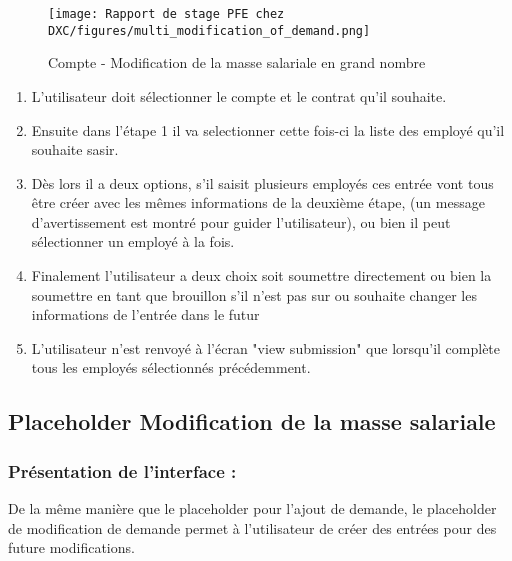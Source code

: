 \begin{figure}[H]
    \centering
    \texttt{[image: Rapport de stage PFE chez DXC/figures/multi\_modification\_of\_demand.png]}
    \caption{Compte - Modification de la masse salariale en grand nombre}
\end{figure}

\begin{enumerate}
    
    \item L'utilisateur doit sélectionner le compte et le contrat qu'il souhaite.
    \vspace{0.1cm}
    \item Ensuite dans l'étape 1 il va selectionner cette fois-ci la liste des employé qu'il souhaite sasir.
    \vspace{0.1cm}
    \item Dès lors il a deux options, s’il saisit plusieurs employés ces entrée vont tous être créer avec les mêmes informations de la deuxième étape, (un message d'avertissement est montré pour guider l'utilisateur), ou bien il peut sélectionner un employé à la fois.
    \vspace{0.1cm}
    \item Finalement l'utilisateur a deux choix soit soumettre directement ou bien la soumettre en tant que brouillon s'il n'est pas sur ou souhaite changer les informations de l'entrée dans le futur
    \item L'utilisateur n'est renvoyé à l'écran "view submission" que lorsqu'il complète tous les employés sélectionnés précédemment.

\end{enumerate}


\newpage


\subsection{Placeholder Modification de la masse salariale}

\subsubsection{Présentation de l'interface :}

De la même manière que le placeholder pour l'ajout de demande, le placeholder de modification de demande permet à l'utilisateur de créer des entrées pour des future modifications.


